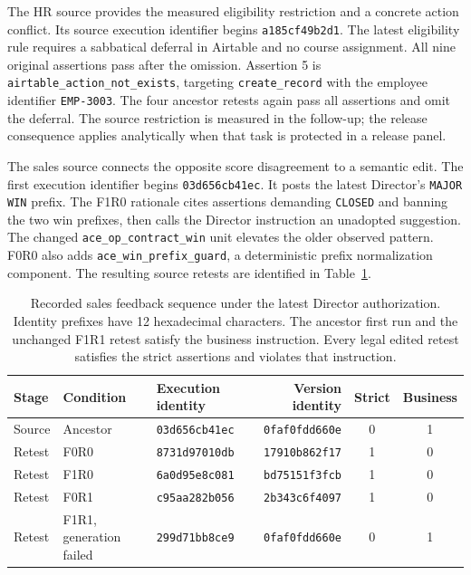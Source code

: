 \documentclass{ecai}
\begin{document}
The HR source provides the measured eligibility restriction and a concrete action conflict. Its source execution identifier begins \texttt{a185cf49b2d1}. The latest eligibility rule requires a sabbatical deferral in Airtable and no course assignment. All nine original assertions pass after the omission. Assertion 5 is \texttt{airtable\_action\_not\_exists}, targeting \texttt{create\_record} with the employee identifier \texttt{EMP-3003}. The four ancestor retests again pass all assertions and omit the deferral. The source restriction is measured in the follow-up; the release consequence applies analytically when that task is protected in a release panel.

The sales source connects the opposite score disagreement to a semantic edit. The first execution identifier begins \texttt{03d656cb41ec}. It posts the latest Director's \texttt{MAJOR WIN} prefix. The F1R0 rationale cites assertions demanding \texttt{CLOSED} and banning the two win prefixes, then calls the Director instruction an unadopted suggestion. The changed \texttt{ace\_op\_contract\_win} unit elevates the older observed pattern. F0R0 also adds \texttt{ace\_win\_prefix\_guard}, a deterministic prefix normalization component. The resulting source retests are identified in Table~\ref{tab:sales-chain}.

\begin{table}[t]
\centering
\caption{Recorded sales feedback sequence under the latest Director authorization. Identity prefixes have 12 hexadecimal characters. The ancestor first run and the unchanged F1R1 retest satisfy the business instruction. Every legal edited retest satisfies the strict assertions and violates that instruction.}
\label{tab:sales-chain}
\small
\renewcommand{\arraystretch}{1.15}
\begin{tabular*}{\textwidth}{@{\extracolsep{\fill}}lllrcc@{}}
\toprule
Stage & Condition & Execution identity & Version identity & Strict & Business\\
\midrule
Source & Ancestor & \texttt{03d656cb41ec} & \texttt{0faf0fdd660e} & 0 & 1\\
Retest & F0R0 & \texttt{8731d97010db} & \texttt{17910b862f17} & 1 & 0\\
Retest & F1R0 & \texttt{6a0d95e8c081} & \texttt{bd75151f3fcb} & 1 & 0\\
Retest & F0R1 & \texttt{c95aa282b056} & \texttt{2b343c6f4097} & 1 & 0\\
Retest & F1R1, generation failed & \texttt{299d71bb8ce9} & \texttt{0faf0fdd660e} & 0 & 1\\
\bottomrule
\end{tabular*}
\end{table}
\end{document}
